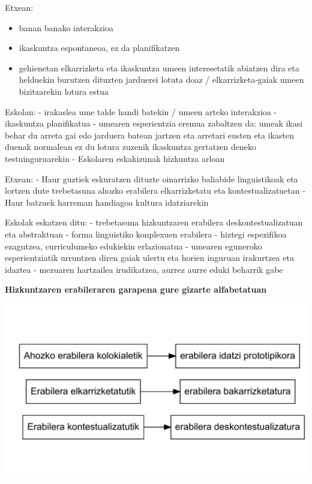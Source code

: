 \documentclass[
]{book}
\providecommand{\tightlist}{%
  \setlength{\itemsep}{0pt}\setlength{\parskip}{0pt}}
\begin{document}
Etxean:

\begin{itemize}
\tightlist
\item
  banan banako interakzioa
\item
  ikaskuntza espontaneoa, ez da planifikatzen
\item
  gehienetan elkarrizketa eta ikaskuntza umeen interesetatik abiatzen dira eta helduekin burutzen dituzten jarduerei lotuta doaz / elkarrizketa‐gaiak umeen bizitzarekin lotura estua
\end{itemize}

Eskolan:
- irakaslea ume talde handi batekin / umeen arteko interakzioa
- ikaskuntza planifikatua
- umearen esperientzia eremua zabaltzen da: umeak ikasi behar du arreta gai edo jarduera batean jartzen eta arretari eusten eta ikasten duenak normalean ez du lotura zuzenik ikaskuntza gertatzen deneko testuinguruarekin
- Eskolaren eskakizunak hizkuntza arloan

Etxean:
- Haur guztiek eskuratzen dituzte oinarrizko baliabide linguistikoak eta lortzen dute trebetasuna ahozko erabilera elkarrizketatu eta kontestualizatuetan
- Haur batzuek harreman handiagoa kultura idatziarekin

Eskolak eskatzen ditu:
- trebetasuna hizkuntzaren erabilera deskontestualizatuan eta abstraktuan
- forma linguistiko konplexuen erabilera
- hiztegi espezifikoa ezagutzea, curriculumeko edukiekin erlazionatua
- umearen eguneroko esperientziatik urruntzen diren gaiak ulertu eta horien inguruan irakurtzea eta idaztea
- mezuaren hartzailea irudikatzea, aurrez aurre eduki beharrik gabe

\textbf{Hizkuntzaren erabileraren garapena gure gizarte alfabetatuan}

\includegraphics{Hizkuntzaren-Didaktikako-apunteak-V-0-HaurHezkuntza-2020_files/figure-latex/5.1-1.pdf}
\end{document}
